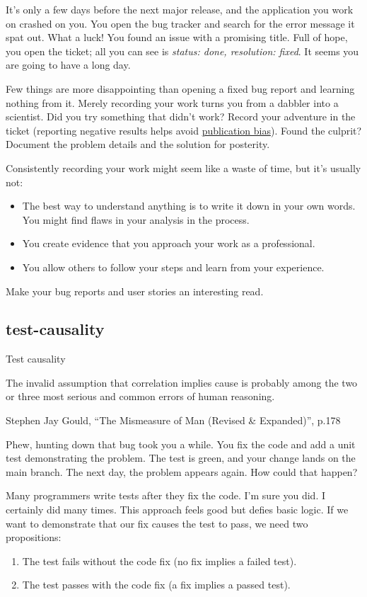 \documentclass{article}
\begin{document}
It's only a few days before the next major release, and the application you work on crashed on you.
You open the bug tracker and search for the error message it spat out.
What a luck!
You found an issue with a promising title.
Full of hope, you open the ticket; all you can see is \emph{status: done, resolution: fixed}.
It seems you are going to have a long day.

Few things are more disappointing than opening a fixed bug report and learning nothing from it.
Merely recording your work turns you from a dabbler into a scientist.
Did you try something that didn't work?
Record your adventure in the ticket (reporting negative results helps avoid \href{https://en.wikipedia.org/wiki/Publication_bias}{publication bias}).
Found the culprit?
Document the problem details and the solution for posterity.

Consistently recording your work might seem like a waste of time, but it's usually not:
\begin{itemize}
\item The best way to understand anything is to write it down in your own words.
You might find flaws in your analysis in the process.
\item You create evidence that you approach your work as a professional.
\item You allow others to follow your steps and learn from your experience.
\end{itemize}

Make your bug reports and user stories an interesting read.

\subsection{test-causality}{Test causality}
\epigraph{
  The invalid assumption that correlation implies cause is probably among the two or three most serious and common errors of human reasoning.
}{Stephen Jay Gould, ``The Mismeasure of Man (Revised \& Expanded)'', p.178}

Phew, hunting down that bug took you a while.
You fix the code and add a unit test demonstrating the problem.
The test is green, and your change lands on the main branch.
The next day, the problem appears again.
How could that happen?

Many programmers write tests after they fix the code.
I'm sure you did.
I certainly did many times.
This approach feels good but defies basic logic.
If we want to demonstrate that our fix causes the test to pass, we need two propositions:
\begin{enumerate}
\item The test fails without the code fix (no fix implies a failed test).
\item The test passes with the code fix (a fix implies a passed test).
\end{enumerate}
\end{document}

